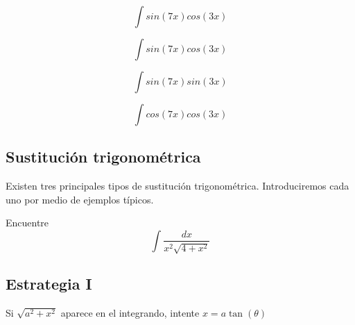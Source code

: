 \begin{resuelto}
  \label{ayr:32.7}
  $$
  \int sin(7x)cos(3x)
  $$
 \end{resuelto}




 \begin{resuelto}
  \label{ayr:exmp:32.8}
  $$
  \int sin(7x)cos(3x)
  $$
 \end{resuelto}




 \begin{resuelto}
  \label{ayr:32.9}
  $$
  \int sin(7x)sin(3x)
  $$
 \end{resuelto}




 \begin{resuelto}
  \label{ayr:32.10}
  $$
  \int cos(7x)cos(3x)
  $$
 \end{resuelto}



\subsection{Sustituci\'on trigonométrica}


Existen tres principales tipos de sustituci\'on trigonométrica. Introduciremos cada uno por medio de ejemplos típicos.



\begin{resuelto}
 \label{ayr:exmp:32.11}
 Encuentre
 $$
 \displaystyle \int \dfrac{dx}{x^{2}\sqrt{4+x^{2}}}
 $$
\end{resuelto}



%
%
%

 \subsection{Estrategia I}

 Si $\sqrt{a^{2}+x^{2}}$ aparece en el integrando, intente $x=a\tan(\theta)$




